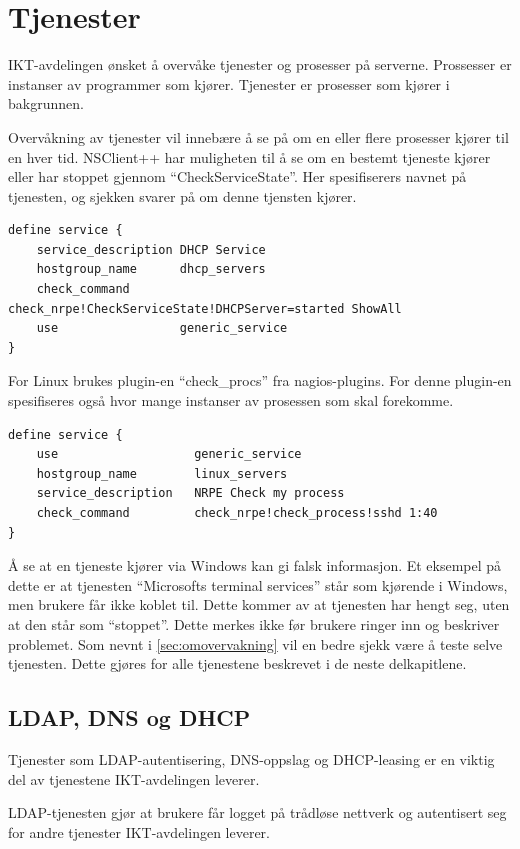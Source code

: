 \section{Tjenester}
IKT-avdelingen ønsket å overvåke tjenester og prosesser på serverne. Prossesser er instanser av programmer som kjører. Tjenester er prosesser som kjører i bakgrunnen. 

Overvåkning av tjenester vil innebære å se på om en eller flere prosesser kjører til en hver tid. NSClient++ har muligheten til å se om en bestemt tjeneste kjører eller har stoppet gjennom ``CheckServiceState''. Her spesifiserers navnet på tjenesten, og sjekken svarer på om denne tjensten kjører.
\begin{lstlisting}[style=example]
define service {
    service_description DHCP Service
    hostgroup_name      dhcp_servers
    check_command       check_nrpe!CheckServiceState!DHCPServer=started ShowAll
    use                 generic_service
}
\end{lstlisting}
For Linux brukes plugin-en ``check\_procs'' fra nagios-plugins. For denne plugin-en spesifiseres også hvor mange instanser av prosessen som skal forekomme. 
\begin{lstlisting}[style=example]
define service {
    use                   generic_service
    hostgroup_name        linux_servers
    service_description   NRPE Check my process
    check_command         check_nrpe!check_process!sshd 1:40
}
\end{lstlisting}

Å se at en tjeneste kjører via Windows kan gi falsk informasjon. Et eksempel på dette er  at tjenesten ``Microsofts terminal services'' står som kjørende i Windows, men brukere får ikke koblet til. Dette kommer av at tjenesten har hengt seg, uten at den står som ``stoppet''. Dette merkes ikke før brukere ringer inn og beskriver problemet\cite{serviceproblem}. Som nevnt i \ref{sec:omovervakning} vil en bedre sjekk være å teste selve tjenesten. Dette gjøres for alle tjenestene beskrevet i de neste delkapitlene.

\subsection{LDAP, DNS og DHCP}
Tjenester som LDAP-autentisering, DNS-oppslag og DHCP-leasing er en viktig del av tjenestene IKT-avdelingen leverer.

LDAP-tjenesten\cite{ldap} gjør at brukere får logget på trådløse nettverk og autentisert seg for andre tjenester IKT-avdelingen leverer.

